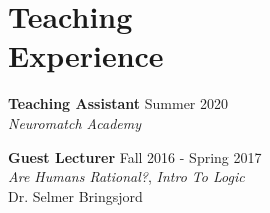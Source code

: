 \section{Teaching\\Experience}
\textbf{Teaching Assistant} \hfill Summer 2020 \\
\emph{Neuromatch Academy}

\textbf{Guest Lecturer} \hfill Fall 2016 - Spring 2017 \\
\emph{Are Humans Rational?}, \emph{Intro To Logic} \\
Dr. Selmer Bringsjord
